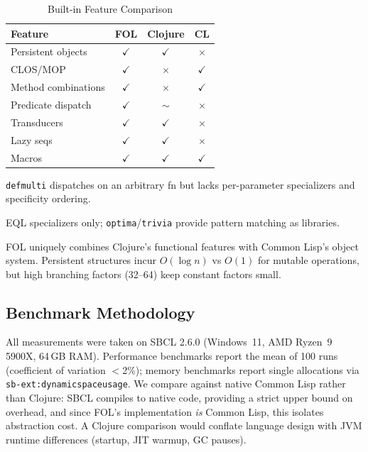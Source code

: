 \documentclass[sigconf,nonacm,review]{acmart}
\begin{document}
\begin{table}[htbp]
\centering
\caption{Built-in Feature Comparison}
\begin{threeparttable} %
    \begin{tabular}{lccc}
    \toprule
    \textbf{Feature} & \textbf{FOL} & \textbf{Clojure} & \textbf{CL} \\
    \midrule
    Persistent objects & $\checkmark$ & $\checkmark$ & $\times$ \\
    CLOS/MOP & $\checkmark$ & $\times$ & $\checkmark$ \\
    Method combinations & $\checkmark$ & $\times$ & $\checkmark$ \\
    Predicate dispatch & $\checkmark$ & $\sim$\tnote{a} & $\times$\tnote{b} \\ %
    Transducers & $\checkmark$ & $\checkmark$ & $\times$ \\
    Lazy seqs & $\checkmark$ & $\checkmark$ & $\times$ \\
    Macros & $\checkmark$ & $\checkmark$ & $\checkmark$ \\
    \bottomrule
    \end{tabular}
    \begin{tablenotes}
        \footnotesize
        \item[a] \texttt{defmulti} dispatches on an arbitrary fn but lacks per-parameter specializers and specificity ordering.
        \item[b] EQL specializers only; \texttt{optima}/\texttt{trivia} provide pattern matching as libraries.
    \end{tablenotes}
\end{threeparttable}
\end{table}

FOL uniquely combines Clojure's functional features with Common Lisp's object system. Persistent structures incur $O(\log n)$ vs $O(1)$ for mutable operations, but high branching factors (32--64) keep constant factors small.

\subsection{Benchmark Methodology}

All measurements were taken on SBCL 2.6.0 (Windows~11, AMD Ryzen~9 5900X, 64\,GB RAM). Performance benchmarks report the mean of 100 runs (coefficient of variation $<$2\%); memory benchmarks report single allocations via
\texttt{sb-ext:dynamic\discretionary{-}{}{-}space\discretionary{-}{}{-}usage}. We compare against native Common Lisp rather than Clojure: SBCL compiles to native code, providing a strict upper bound on overhead, and since
FOL's implementation \textit{is} Common Lisp, this isolates abstraction cost. A Clojure comparison would conflate language design with JVM runtime differences (startup, JIT warmup, GC pauses).
\end{document}
